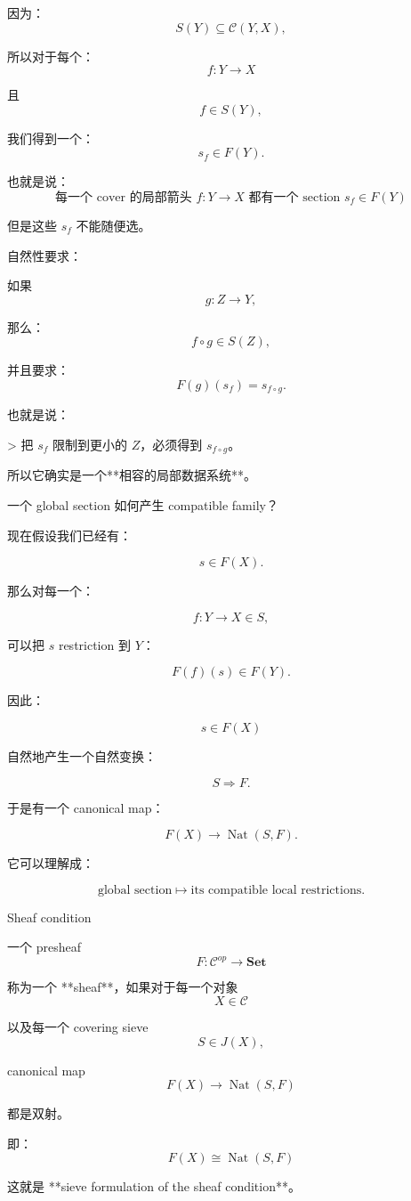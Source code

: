 \documentclass{beamer}
\begin{document}
\begin{frame}
\begin{markdown}
因为：
$$
S(Y)\subseteq\mathcal C(Y,X),
$$

所以对于每个：
$$
f:Y\to X
$$

且
$$
f\in S(Y),
$$

我们得到一个：
$$
s_f\in F(Y).
$$

也就是说：
$$
\boxed{
\text{每一个 cover 的局部箭头 }f:Y\to X
\text{ 都有一个 section }s_f\in F(Y)
}
$$

但是这些 $s_f$ 不能随便选。

自然性要求：

如果
$$
g:Z\to Y,
$$

那么：
$$
f\circ g\in S(Z),
$$

并且要求：
$$
\boxed{
F(g)(s_f)=s_{f\circ g}.
}
$$

也就是说：

> 把 $s_f$ 限制到更小的 $Z$，必须得到 $s_{f\circ g}$。

所以它确实是一个**相容的局部数据系统**。
\end{markdown}
\end{frame}

\begin{frame}{一个 global section 如何产生 compatible family？}
\begin{markdown}
现在假设我们已经有：

$$
s\in F(X).
$$

那么对每一个：

$$
f:Y\to X\in S,
$$

可以把 $s$ restriction 到 $Y$：

$$
F(f)(s)\in F(Y).
$$

因此：

$$
s\in F(X)
$$

自然地产生一个自然变换：

$$
S\Rightarrow F.
$$

于是有一个 canonical map：

$$
\boxed{
F(X)\longrightarrow\operatorname{Nat}(S,F).
}
$$

它可以理解成：

$$
\boxed{
\text{global section}
\longmapsto
\text{its compatible local restrictions}.
}
$$
\end{markdown}
\end{frame}

\begin{frame}[fragile]{Sheaf condition}
\begin{markdown}
一个 presheaf
$$
F:\mathcal C^{op}\to\mathbf{Set}
$$

称为一个 **sheaf**，如果对于每一个对象
$$
X\in\mathcal C
$$

以及每一个 covering sieve
$$
S\in J(X),
$$

canonical map
$$
\boxed{
F(X)\longrightarrow\operatorname{Nat}(S,F)
}
$$

都是双射。

即：
$$
\boxed{
F(X)\cong\operatorname{Nat}(S,F)
}
$$

这就是 **sieve formulation of the sheaf condition**。
\end{markdown}
\end{frame}
\end{document}
